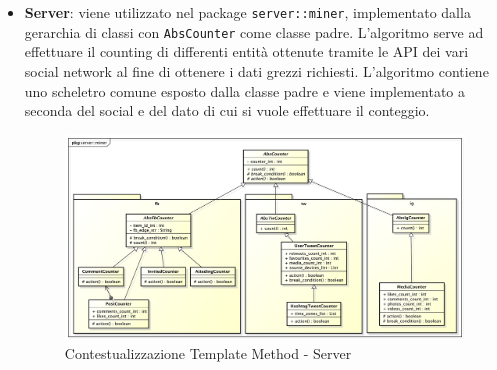 \begin{itemize}
\begin{itemize}
					\item \textbf{Server}: viene utilizzato nel package \texttt{server::miner}, implementato dalla gerarchia di classi con \texttt{AbsCounter} come classe padre. L'algoritmo serve ad effettuare il counting di differenti entità ottenute tramite le API dei vari social network al fine di ottenere i dati grezzi richiesti. L'algoritmo contiene uno scheletro comune esposto dalla classe padre e viene implementato a seconda del social e del dato di cui si vuole effettuare il conteggio. \newline
					\begin{figure}[!htbp]
						\centering
						\centerline{\includegraphics[scale=0.30]{./images/design_pattern_server/dp_template_method.pdf}}
						\caption{Contestualizzazione Template Method - Server}
					\end{figure}
				\end{itemize}
		\end{itemize}

